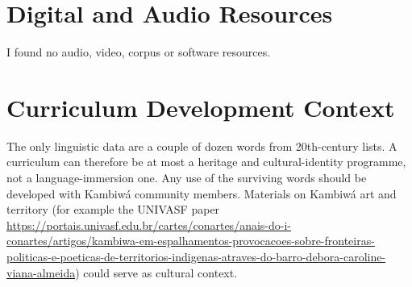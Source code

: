 \documentclass[12pt]{article}
\begin{document}
\section{Digital and Audio Resources}
I found no audio, video, corpus or software resources.

\section{Curriculum Development Context}
The only linguistic data are a couple of dozen words from 20th-century lists. A curriculum can therefore be at most a heritage and cultural-identity programme, not a language-immersion one. Any use of the surviving words should be developed with Kambiw\'a community members. Materials on Kambiw\'a art and territory (for example the UNIVASF paper \url{https://portais.univasf.edu.br/cartes/conartes/anais-do-i-conartes/artigos/kambiwa-em-espalhamentos-provocacoes-sobre-fronteiras-politicas-e-poeticas-de-territorios-indigenas-atraves-do-barro-debora-caroline-viana-almeida}) could serve as cultural context.
\end{document}
